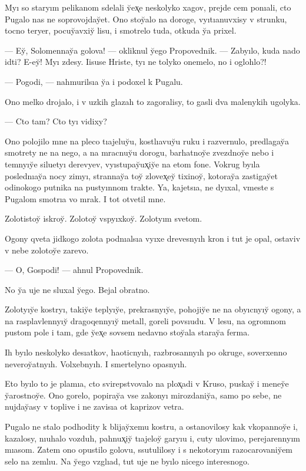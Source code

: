 \documentclass[10pt]{book}
\begin{document}
Myı so staryım pelikanom sdelali y̆ex̨e neskolyko xagov, prejde cem ponıali, cto Pugalo nas ne soprovojday̆et. Ono stoy̆alo na doroge, vyıtıanuvxisy v strunku, tocno teryer, pocuy̆avxiy̆ lisu, i smotrelo tuda, otkuda y̆a prixel.

— Ey̆, Solomennay̆a golova! — okliknul y̆ego Propovednik. — Zabyılo, kuda nado idti? E-ey̆! Myı zdesy. Iisuse Hriste, tyı ne tolyko onemelo, no i oglohlo?!

— Pogodi, — nahmurilsıa y̆a i podoxel k Pugalu.

Ono melko drojalo, i v uzkih glazah to zagoralisy, to gasli dva malenykih ugolyka.

— Cto tam? Cto tyı vidixy?

Ono polojilo mne na pleco tıajeluy̆u, kostlıavuy̆u ruku i razvernulo, predlagay̆a smotrety ne na nego, a na mracnuy̆u dorogu, barhatnoy̆e zvezdnoy̆e nebo i temnyıy̆e siluetyı derevyev, vyıstupay̆ux̨iy̆e na etom fone. Vokrug byıla poslednıay̆a nocy zimyı, strannay̆a toy̆ zlovex̨ey̆ tixinoy̆, kotoray̆a zastigay̆et odinokogo putnika na pustyınnom trakte. Ya, kajetsıa, ne dyıxal, vmeste s Pugalom smotrıa vo mrak. I tot otvetil mne.

Zolotistoy̆ iskroy̆. Zolotoy̆ vspyıxkoy̆. Zolotyım svetom.

Ogony qveta jidkogo zolota podnıalsıa vyıxe drevesnyıh kron i tut je opal, ostaviv v nebe zolotoy̆e zarevo.

— O, Gospodi! — ahnul Propovednik.

No y̆a uje ne sluxal y̆ego. Bejal obratno.



Zolotyıy̆e kostryı, takiy̆e teplyıy̆e, prekrasnyıy̆e, pohojiy̆e ne na obyıcnyıy̆ ogony, a na rasplavlennyıy̆ dragoqennyıy̆ metall, goreli povsıudu. V lesu, na ogromnom pustom pole i tam, gde y̆ex̨e sovsem nedavno stoy̆ala staray̆a ferma.

Ih byılo neskolyko desıatkov, haoticnyıh, razbrosannyıh po okruge, soverxenno neveroy̆atnyıh. Volxebnyıh. I smertelyno opasnyıh.

Eto byılo to je plamıa, cto svirepstvovalo na plox̨adi v Kruso, puskay̆ i meney̆e y̆arostnoy̆e. Ono gorelo, popiray̆a vse zakonyı mirozdaniy̆a, samo po sebe, ne nujday̆asy v toplive i ne zavisıa ot kaprizov vetra.

Pugalo ne stalo podhodity k blijay̆xemu kostru, a ostanovilosy kak vkopannoy̆e i, kazalosy, nıuhalo vozduh, pahnux̨iy̆ tıajeloy̆ garyıu i, cuty ulovimo, perejarennyım mıasom. Zatem ono opustilo golovu, ssutulilosy i s nekotoryım razocarovaniy̆em selo na zemlıu. Na y̆ego vzglıad, tut uje ne byılo nicego interesnogo.
\end{document}
